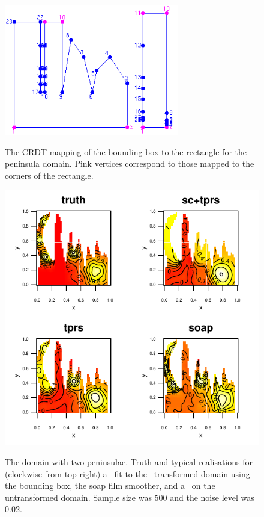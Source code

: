 \begin{figure}[t]
\centering
\includegraphics[width=3in]{sc/figs/wigglytop2-bbox-numbered.png} \\
\caption{The CRDT mapping of the bounding box to the rectangle for the peninsula domain. Pink vertices correspond to those mapped to the corners of the rectangle.}
\label{wigglytop2-bbox-numbered}
\end{figure}


\begin{figure}
\centering
\includegraphics[width=6in]{sc/figs/wigglytop2-bbox-real.pdf} \\
\caption{The domain with two peninsulae. Truth and typical realisations for (clockwise from top right) a \tprs\ fit to the \sch\ transformed domain using the bounding box, the soap film smoother, and a \tprs\ on the untransformed domain. Sample size was 500 and the noise level was 0.02.}
\label{wigglytop2-bbox-real}
\end{figure}



